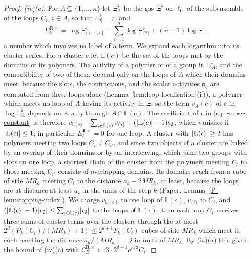 \documentclass[11pt]{preprint}
\DeclarePairedDelimiter{\abs}{\lvert}{\rvert}
\numberwithin{equation}{section}
\theoremstyle{definition}
\theoremstyle{remark}
\theoremstyle{plain}
\begin{document}
\begin{proof}
\emph{(iv)(c).} For $A \subseteq \{ 1, \dots, n \}$ let $\Xi^\flat_A$ be the gas $\Xi^\flat$ on $\ell_0$ of the subensemble of the loops $C_i$, $i \in A$, so that $\Xi^\flat_\emptyset = \Xi$ and
\begin{equation}\label{eq:r-cross-constant}
    E^{\mathbf R\times}_k = \log\Xi^\flat_{\{1, \dots, n\}} - \sum_{i=1}^{n}\log\Xi^\flat_{\{i\}} + (n - 1)\log\Xi\;,
\end{equation}
a number which involves no label of a term. We expand each logarithm into its cluster series. For a cluster $c$ let $\mathbb L(c)$ be the set of the loops met by the domains of its polymers. The activity of a polymer or of a group in $\Xi^\flat_A$, and the compatibility of two of them, depend only on the loops of $A$ which their domains meet, because the slots, the contractions, and the scalar activities $\mathfrak a_g$ are computed from these loops alone (Lemma~\ref{lem:loop-localisation}(ii)), a polymer which meets no loop of $A$ having its activity in $\Xi$; so the term $v_A(c)$ of $c$ in $\log\Xi^\flat_A$ depends on $A$ only through $A \cap \mathbb L(c)$. The coefficient of $c$ in \eqref{eq:r-cross-constant} is therefore $v_{\mathbb L(c)} - \sum_{i \in \mathbb L(c)}v_{\{i\}} + (\abs{\mathbb L(c)} - 1)v_\emptyset$, which vanishes if $\abs{\mathbb L(c)} \leq 1$; in particular $E^{\mathbf R\times}_k = 0$ for one loop. A cluster with $\abs{\mathbb L(c)} \geq 2$ has polymers meeting two loops $C_i \neq C_{i'}$, and since two objects of a cluster are linked by an overlap of their domains or by an interleaving, which joins two groups with slots on one loop, a shortest chain of the cluster from the polymers meeting $C_i$ to those meeting $C_{i'}$ consists of overlapping domains. Its domains reach from a cube of side $MR_k$ meeting $C_i$ to the distance $a_k - 2MR_k$, at least, because the loops are at distance at least $a_k$ in the units of the step $k$ (Paper, Lemma~\ref{P-lem:stopping-index}). We charge $v_{\mathbb L(c)}$ to one loop of $\mathbb L(c)$, $v_{\{i\}}$ to $C_i$, and $(\abs{\mathbb L(c)} - 1)\abs{v_\emptyset} \leq \sum_{i \in \mathbb L(c)}\abs{v_\emptyset}$ to the loops of $\mathbb L(c)$; then each loop $C_i$ receives three sums of cluster terms over the clusters through the at most $2^d(P_k(C_i)/(MR_k) + 1) \leq 2^{d+1}P_k(C_i)$ cubes of side $MR_k$ which meet it, each reaching the distance $a_k/(MR_k) - 2$ in units of $MR_k$. By (iv)(a) this gives the bound of (iv)(c) with $C^{\mathbf R\times}_E \coloneqq 3 \cdot 2^{d+1}e^{\kappa/3}C_t$.


\end{proof}
\end{document}
